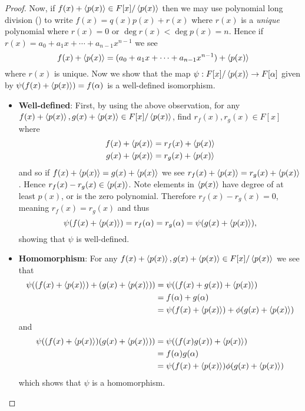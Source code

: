 \begin{proof}
    Now, if $f(x) + \left\langle p(x)\right\rangle \in F[x]/\left\langle p(x)\right\rangle$ then we may use polynomial long division () to write $f(x) = q(x)p(x) + r(x)$ where $r(x)$ is a \textit{unique} polynomial where $r(x) = 0$ or $\deg r(x) < \deg p(x) = n$. Hence if $r(x) = a_0 + a_1x + \cdots + a_{n-1}x^{n-1}$ we see
    \[
        f(x) + \left\langle p(x)\right\rangle = (a_0 + a_1x + \cdots + a_{n-1}x^{n-1}) + \left\langle p(x)\right\rangle
    \]
    where $r(x)$ is unique. Now we show that the map $\psi: F[x]/\left\langle p(x)\right\rangle \to F[\alpha]$ given by $\psi(f(x) + \left\langle p(x)\right\rangle) = f(\alpha)$ is a well-defined isomorphism.
    \begin{itemize}
        \item \textbf{Well-defined}: First, by using the above observation, for any $f(x) + \left\langle p(x)\right\rangle, g(x) + \left\langle p(x)\right\rangle \in F[x]/\left\langle p(x)\right\rangle$, find $r_f(x), r_g(x) \in F[x]$ where
        \begin{align*}
            f(x) + \left\langle p(x)\right\rangle &= r_f(x) + \left\langle p(x)\right\rangle\\
            g(x) + \left\langle p(x)\right\rangle &= r_g(x) + \left\langle p(x)\right\rangle
        \end{align*}
        and so if $f(x) + \left\langle p(x)\right\rangle = g(x) + \left\langle p(x)\right\rangle$ we see $r_f(x) + \left\langle p(x)\right\rangle = r_g(x) + \left\langle p(x)\right\rangle$. Hence $r_f(x) - r_g(x) \in \left\langle p(x)\right\rangle$. Note elements in $\left\langle p(x)\right\rangle$ have degree of at least $p(x)$, or is the zero polynomial. Therefore $r_f(x) - r_g(x) = 0$, meaning $r_f(x) = r_g(x)$ and thus
        \[
            \psi(f(x) + \left\langle p(x)\right\rangle) = r_f(\alpha) = r_g(\alpha) = \psi(g(x) + \left\langle p(x)\right\rangle),
        \]
        showing that $\psi$ is well-defined.

        \item \textbf{Homomorphism}: For any $f(x) + \left\langle p(x)\right\rangle, g(x) + \left\langle p(x)\right\rangle \in F[x]/\left\langle p(x)\right\rangle$ we see that
        \begin{align*}
            \psi((f(x) + \left\langle p(x)\right\rangle) + (g(x) + \left\langle p(x)\right\rangle)) &= \psi((f(x) + g(x)) + \left\langle p(x)\right\rangle)\\
            &= f(\alpha) + g(\alpha)\\
            &= \psi(f(x) + \left\langle p(x)\right\rangle) + \phi(g(x) + \left\langle p(x)\right\rangle)
        \end{align*}
        and
        \begin{align*}
            \psi((f(x) + \left\langle p(x)\right\rangle)(g(x) + \left\langle p(x)\right\rangle)) &= \psi((f(x)g(x)) + \left\langle p(x)\right\rangle)\\
            &= f(\alpha)g(\alpha)\\
            &= \psi(f(x) + \left\langle p(x)\right\rangle)\phi(g(x) + \left\langle p(x)\right\rangle)
        \end{align*}
        which shows that $\psi$ is a homomorphism.


\end{itemize}
\end{proof}
